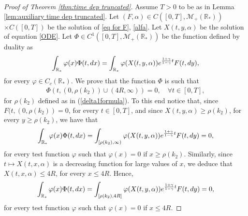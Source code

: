 \documentclass[11pt]{article}
\numberwithin{equation}{section}
\theoremstyle{plain}
\newcommand{\der}{\textup{d}}
\begin{document}
\begin{proof}[Proof of Theorem \ref{thm:time dep truncated}]
Assume $T>0$ to be as in Lemma \ref{lem:auxiliary time dep truncated}. 
Let $(F, \alpha ) \in C([0,T], \mathcal M_+(\mathbb R_*)) $ $\times C([0,T])$ be the solution of \eqref{eq for F}, \eqref{alfa}. 
Let $X(t,y, \alpha)$ be the solution of equation \eqref{ODE}. 
Let $ \Phi \in C^1([0,T], \mathcal M_+(\mathbb R_*))$ be the function defined by duality as 
\begin{align}\label{phi function of F}
\int_{\mathbb R_*} \varphi(x) \Phi(t, \der x)=\int_{\mathbb R_*} \varphi(X(t,y, \alpha))  e^{\frac{1+\gamma}{1-\gamma }t} F(t, \der y),
\end{align} 
for every $\varphi \in C_c(\mathbb R_*)$. 
We prove that the function $\Phi$ is such that
\begin{align}\label{support truncated time solution}
\Phi (t,(0, \rho(k_2)) \cup (4R, \infty ))=0, \quad \forall t \in [0,T],
\end{align}
for $\rho(k_2)$ defined as in (\ref{delta1formula}).
To this end notice that, since $F(t,(0,\rho(k_{2}))=0$, for every $t\in[0,T]$, and since $ X(t, y, \alpha) \geq \rho(k_2)$, for every $y \geq \rho(k_2)$,  we have that 
\[
\int_{\mathbb R_* } \varphi(x) \Phi(t, \der x) =\int_{[\rho(k_2),\infty)} \varphi(X(t,y, \alpha))  e^{\frac{1+\gamma}{1-\gamma }t} F(t, \der y)=0,
\]
for every test function $\varphi$ such that $\varphi(x)=0$ if $x \geq \rho(k_2)$. 
Similarly,
since $t \mapsto X(t, x, \alpha) $ is a decreasing function for large values of $x$, we deduce that $ X(t, x, \alpha)\leq 4R$, for every $x \leq 4R $. Hence, 
\[
\int_{\mathbb R_* } \varphi(x) \Phi(t, \der x) =\int_{[\rho(k_2), 4 R]} \varphi(X(t,y, \alpha))  e^{\frac{1+\gamma}{1-\gamma }t} F(t, \der y)=0,
\]
for every test function $\varphi$ such that $\varphi(x)=0$ if $x \leq 4 R$. 


\end{proof}
\end{document}
